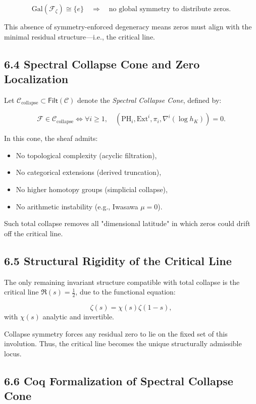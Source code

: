 \documentclass[11pt]{article}
\begin{document}
\[
\mathrm{Gal}(\mathcal{F}_{\zeta}) \cong \{e\} \quad \Rightarrow \quad \text{no global symmetry to distribute zeros}.
\]

This absence of symmetry-enforced degeneracy means zeros must align with the minimal residual structure—i.e., the critical line.

\subsection*{6.4 Spectral Collapse Cone and Zero Localization}

Let \( \mathcal{C}_{\mathrm{collapse}} \subset \mathsf{Filt}(\mathcal{C}) \) denote the \textit{Spectral Collapse Cone}, defined by:

\[
\mathcal{F} \in \mathcal{C}_{\mathrm{collapse}} \iff \forall i \geq 1, \quad 
\left( \mathrm{PH}_i, \mathrm{Ext}^i, \pi_i, \nabla^i (\log h_K) \right) = 0.
\]

In this cone, the sheaf admits:

\begin{itemize}
  \item No topological complexity (acyclic filtration),
  \item No categorical extensions (derived truncation),
  \item No higher homotopy groups (simplicial collapse),
  \item No arithmetic instability (e.g., Iwasawa \( \mu = 0 \)).
\end{itemize}

Such total collapse removes all "dimensional latitude" in which zeros could drift off the critical line.

\subsection*{6.5 Structural Rigidity of the Critical Line}

The only remaining invariant structure compatible with total collapse is the critical line \( \Re(s) = \tfrac{1}{2} \), due to the functional equation:

\[
\zeta(s) = \chi(s)\zeta(1-s),
\]
with \( \chi(s) \) analytic and invertible.

Collapse symmetry forces any residual zero to lie on the fixed set of this involution. Thus, the critical line becomes the unique structurally admissible locus.

\subsection*{6.6 Coq Formalization of Spectral Collapse Cone}
\end{document}
